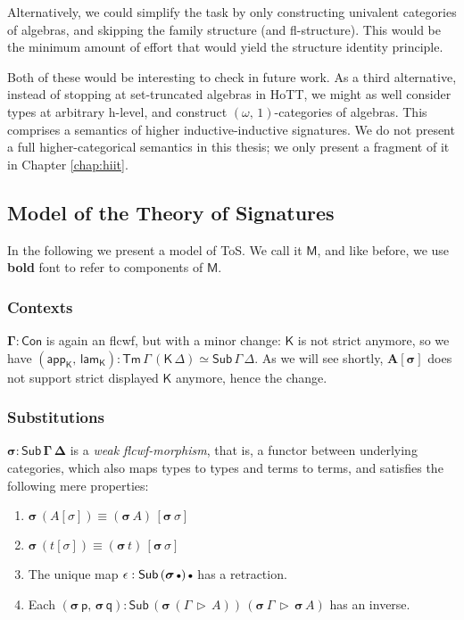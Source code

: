 \documentclass[12pt,a4paper,twoside,openany]{book}
\theoremstyle{remark}
\theoremstyle{definition}
\theoremstyle{theorem}
\newcommand{\bs}[1]{\boldsymbol{#1}}
\newcommand{\Con}{\mathsf{Con}}
\newcommand{\Sub}{\mathsf{Sub}}
\newcommand{\Tm}{\mathsf{Tm}}
\newcommand{\ext}{\triangleright}
\newcommand{\emptycon}{\scaleobj{.75}\bullet}
\newcommand{\lamK}{\mathsf{lam}_{\K}}
\newcommand{\appK}{\mathsf{app}_{\K}}
\newcommand{\p}{\mathsf{p}}
\newcommand{\q}{\mathsf{q}}
\newcommand{\K}{\mathsf{K}}
\newcommand{\bCon}{\bs{\Con}}
\newcommand{\bGamma}{\bs{\Gamma}}
\newcommand{\bsigma}{\bs{\sigma}}
\newcommand{\bM}{\bs{\mathsf{M}}}
\begin{document}
Alternatively, we could simplify the task by only constructing univalent
categories of algebras, and skipping the family structure (and
fl-structure). This would be the minimum amount of effort that would yield the
structure identity principle.

Both of these would be interesting to check in future work. As a third
alternative, instead of stopping at set-truncated algebras in HoTT, we might as
well consider types at arbitrary h-level, and construct
$(\omega,\,1)$-categories of algebras. This comprises a semantics of higher
inductive-inductive signatures. We do not present a full higher-categorical
semantics in this thesis; we only present a fragment of it in Chapter
\ref{chap:hiit}.

\subsection{Model of the Theory of Signatures}

In the following we present a model of ToS. We call it $\bM$, and like before,
we use \textbf{bold} font to refer to components of $\bM$.

\subsubsection{Contexts}

$\bGamma : \bCon$ is again an flcwf, but with a minor change: $\K$ is not strict
anymore, so we have $(\appK,\,\lamK) : \Tm\,\Gamma\,(\K\,\Delta) \simeq
\Sub\,\Gamma\,\Delta$. As we will see shortly, $\bs{A[\sigma]}$ does not
support strict displayed $\K$ anymore, hence the change.

\subsubsection{Substitutions}
\label{sec:iqiit-substitutions}

$\bs{\sigma : \Sub\,\Gamma\,\Delta}$ is a \emph{weak flcwf-morphism}, that is, a
functor between underlying categories, which also maps types to types and terms
to terms, and satisfies the following mere properties:
  \begin{enumerate}
    \item $\bsigma\,(A[\sigma]) \equiv (\bsigma\,A)\,[\bsigma\,\sigma]$
    \item $\bsigma\,(t[\sigma]) \equiv (\bsigma\,t)\,[\bsigma\,\sigma]$
    \item The unique map $\epsilon : \Sub\,(\bsigma\,\emptycon)\,\emptycon$ has a retraction.
    \item Each $(\bsigma\,\p,\,\bsigma\,\q) : \Sub\,(\bsigma\,(\Gamma\,\ext\,A))\,(\bsigma\,\Gamma\,\ext\,\bsigma\,A)$ has an inverse.
  \end{enumerate}
\end{document}
